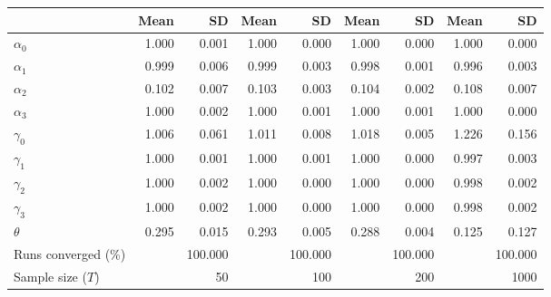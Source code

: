 
\begin{tabular}[t]{lrrrrrrrr}
\toprule
  & Mean & SD & Mean  & SD  & Mean   & SD   & Mean    & SD   \\
\midrule
$\alpha_{0}$ & 1.000 & 0.001 & 1.000 & 0.000 & 1.000 & 0.000 & 1.000 & 0.000\\
$\alpha_{1}$ & 0.999 & 0.006 & 0.999 & 0.003 & 0.998 & 0.001 & 0.996 & 0.003\\
$\alpha_{2}$ & 0.102 & 0.007 & 0.103 & 0.003 & 0.104 & 0.002 & 0.108 & 0.007\\
$\alpha_{3}$ & 1.000 & 0.002 & 1.000 & 0.001 & 1.000 & 0.001 & 1.000 & 0.000\\
$\gamma_{0}$ & 1.006 & 0.061 & 1.011 & 0.008 & 1.018 & 0.005 & 1.226 & 0.156\\
$\gamma_{1}$ & 1.000 & 0.001 & 1.000 & 0.001 & 1.000 & 0.000 & 0.997 & 0.003\\
$\gamma_{2}$ & 1.000 & 0.002 & 1.000 & 0.000 & 1.000 & 0.000 & 0.998 & 0.002\\
$\gamma_{3}$ & 1.000 & 0.002 & 1.000 & 0.000 & 1.000 & 0.000 & 0.998 & 0.002\\
$\theta$ & 0.295 & 0.015 & 0.293 & 0.005 & 0.288 & 0.004 & 0.125 & 0.127\\
Runs converged (\%) &  & 100.000 &  & 100.000 &  & 100.000 &  & 100.000\\
Sample size ($T$) &  & 50 &  & 100 &  & 200 &  & 1000\\
\bottomrule
\end{tabular}
